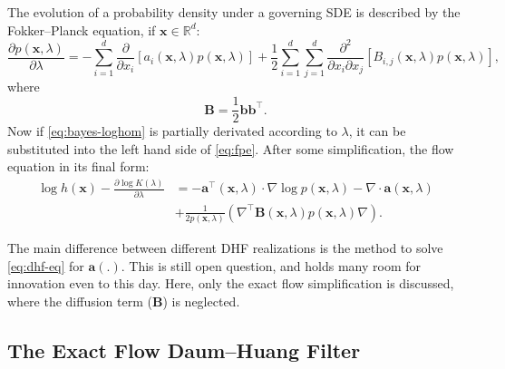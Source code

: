 The evolution of a probability density under a governing SDE is described by the Fokker--Planck equation, if $\mathbf{x} \in \mathbb{R}^d$:
\begin{equation}\label{eq:fpe}
    \frac{\partial p(\mathbf{x},\lambda)}{\partial \lambda} = -\sum_{i = 1}^{d}\frac{\partial}{\partial x_i}\left[a_i(\mathbf{x},\lambda)p(\mathbf{x},\lambda)\right] + \frac{1}{2}\sum_{i = 1}^{d}\sum_{j = 1}^{d}\frac{\partial^2}{\partial x_i \partial x_j}\left[B_{i,j}(\mathbf{x},\lambda)p(\mathbf{x},\lambda)\right],
\end{equation}
where
\begin{equation}\label{key}
    \mathbf{B} = \frac{1}{2}\mathbf{b}\mathbf{b}^\top.
\end{equation}
Now if \eqref{eq:bayes-loghom} is partially derivated according to $\lambda$, it can be substituted into the left hand side of \eqref{eq:fpe}. After some simplification, the flow equation in its final form:
\begin{align}\label{eq:dhf-eq}
    \log h(\mathbf{x}) - \frac{\partial \log K(\lambda)}{\partial \lambda} & = -\mathbf{a}^\top(\mathbf{x},\lambda)\cdot\nabla\log p(\mathbf{x},\lambda) - \nabla\cdot \mathbf{a}(\mathbf{x},\lambda)       \\
                                                                           & + \frac{1}{2p(\mathbf{x},\lambda)}\left(\nabla^\top\mathbf{B}(\mathbf{x},\lambda)p(\mathbf{x},\lambda)\nabla\right). \nonumber
\end{align}

The main difference between different DHF realizations is the method to solve \eqref{eq:dhf-eq} for $\mathbf{a}(.)$. This is still open question, and holds many room for innovation even to this day.  Here, only the exact flow simplification \cite{Daum2010} is discussed, where the diffusion term ($\mathbf{B}$) is neglected.

\subsection{The Exact Flow Daum--Huang Filter}

